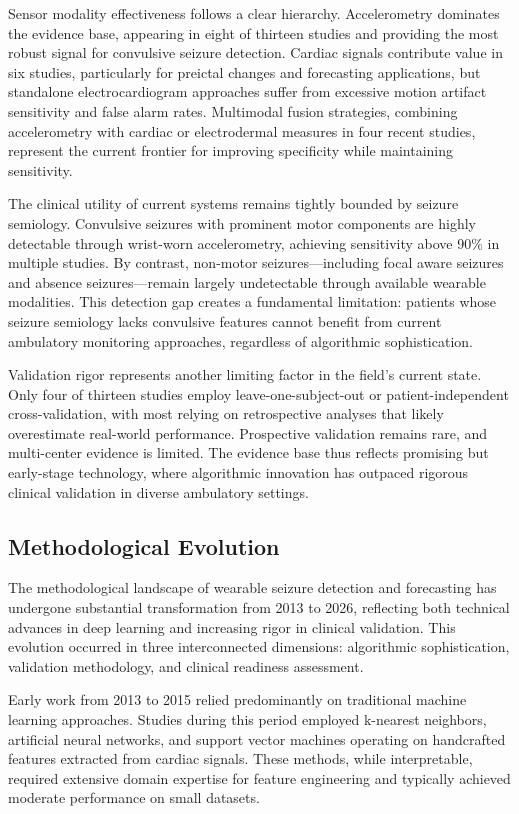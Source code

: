 Sensor modality effectiveness follows a clear hierarchy. Accelerometry dominates the evidence base, appearing in eight of thirteen studies and providing the most robust signal for convulsive seizure detection. Cardiac signals contribute value in six studies, particularly for preictal changes and forecasting applications, but standalone electrocardiogram approaches suffer from excessive motion artifact sensitivity and false alarm rates. Multimodal fusion strategies, combining accelerometry with cardiac or electrodermal measures in four recent studies, represent the current frontier for improving specificity while maintaining sensitivity.

The clinical utility of current systems remains tightly bounded by seizure semiology. Convulsive seizures with prominent motor components are highly detectable through wrist-worn accelerometry, achieving sensitivity above 90\% in multiple studies. By contrast, non-motor seizures---including focal aware seizures and absence seizures---remain largely undetectable through available wearable modalities. This detection gap creates a fundamental limitation: patients whose seizure semiology lacks convulsive features cannot benefit from current ambulatory monitoring approaches, regardless of algorithmic sophistication.

Validation rigor represents another limiting factor in the field's current state. Only four of thirteen studies employ leave-one-subject-out or patient-independent cross-validation, with most relying on retrospective analyses that likely overestimate real-world performance. Prospective validation remains rare, and multi-center evidence is limited. The evidence base thus reflects promising but early-stage technology, where algorithmic innovation has outpaced rigorous clinical validation in diverse ambulatory settings.

\subsection{Methodological Evolution}

The methodological landscape of wearable seizure detection and forecasting has undergone substantial transformation from 2013 to 2026, reflecting both technical advances in deep learning and increasing rigor in clinical validation. This evolution occurred in three interconnected dimensions: algorithmic sophistication, validation methodology, and clinical readiness assessment.

Early work from 2013 to 2015 relied predominantly on traditional machine learning approaches. Studies during this period employed k-nearest neighbors, artificial neural networks, and support vector machines operating on handcrafted features extracted from cardiac signals. These methods, while interpretable, required extensive domain expertise for feature engineering and typically achieved moderate performance on small datasets.

